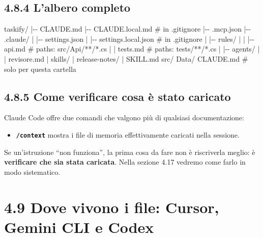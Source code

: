 \documentclass[
  italian,
  10pt,
]{book}
\newenvironment{Shaded}{\begin{snugshade}}{\end{snugshade}}
\newcommand{\NormalTok}[1]{#1}
\providecommand{\tightlist}{%
  \setlength{\itemsep}{0pt}\setlength{\parskip}{0pt}}
\begin{document}
\subsection{4.8.4 L'albero completo}\label{lalbero-completo}

\begin{Shaded}
\begin{Highlighting}[]
\NormalTok{taskify/}
\NormalTok{|{-}{-} CLAUDE.md}
\NormalTok{|{-}{-} CLAUDE.local.md                 \# in .gitignore}
\NormalTok{|{-}{-} .mcp.json}
\NormalTok{|{-}{-} .claude/}
\NormalTok{|   |{-}{-} settings.json}
\NormalTok{|   |{-}{-} settings.local.json         \# in .gitignore}
\NormalTok{|   |{-}{-} rules/}
\NormalTok{|   |   |{-}{-} api.md                  \# paths: src/Api/**/*.cs}
\NormalTok{|   |   \textasciigrave{}{-}{-} tests.md                \# paths: tests/**/*.cs}
\NormalTok{|   |{-}{-} agents/}
\NormalTok{|   |   \textasciigrave{}{-}{-} revisore.md}
\NormalTok{|   \textasciigrave{}{-}{-} skills/}
\NormalTok{|       \textasciigrave{}{-}{-} release{-}notes/}
\NormalTok{|           \textasciigrave{}{-}{-} SKILL.md}
\NormalTok{\textasciigrave{}{-}{-} src/}
\NormalTok{    \textasciigrave{}{-}{-} Data/}
\NormalTok{        \textasciigrave{}{-}{-} CLAUDE.md               \# solo per questa cartella}
\end{Highlighting}
\end{Shaded}

\subsection{4.8.5 Come verificare cosa è stato
caricato}\label{come-verificare-cosa-uxe8-stato-caricato}

Claude Code offre due comandi che valgono più di qualsiasi
documentazione:

\begin{itemize}
\tightlist
\item
  \textbf{\texttt{/context}} mostra i file di memoria effettivamente
  caricati nella sessione.
\end{itemize}

Se un'istruzione ``non funziona'', la prima cosa da fare non è
riscriverla meglio: è \textbf{verificare che sia stata caricata}. Nella
sezione 4.17 vedremo come farlo in modo sistematico.

\section{4.9 Dove vivono i file: Cursor, Gemini CLI e
Codex}\label{dove-vivono-i-file-cursor-gemini-cli-e-codex}
\end{document}
